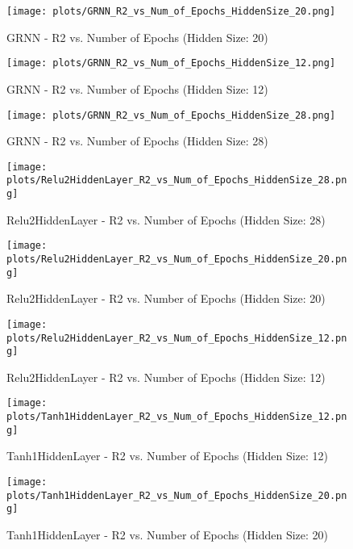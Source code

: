
\begin{figure}[H]
    \centering
    \texttt{[image: plots/GRNN\_R2\_vs\_Num\_of\_Epochs\_HiddenSize\_20.png]}
    \caption{GRNN - R2 vs. Number of Epochs (Hidden Size: 20)}
\end{figure}

\begin{figure}[H]
    \centering
    \texttt{[image: plots/GRNN\_R2\_vs\_Num\_of\_Epochs\_HiddenSize\_12.png]}
    \caption{GRNN - R2 vs. Number of Epochs (Hidden Size: 12)}
\end{figure}

\begin{figure}[H]
    \centering
    \texttt{[image: plots/GRNN\_R2\_vs\_Num\_of\_Epochs\_HiddenSize\_28.png]}
    \caption{GRNN - R2 vs. Number of Epochs (Hidden Size: 28)}
\end{figure}

\begin{figure}[H]
    \centering
    \texttt{[image: plots/Relu2HiddenLayer\_R2\_vs\_Num\_of\_Epochs\_HiddenSize\_28.png]}
    \caption{Relu2HiddenLayer - R2 vs. Number of Epochs (Hidden Size: 28)}
\end{figure}

\begin{figure}[H]
    \centering
    \texttt{[image: plots/Relu2HiddenLayer\_R2\_vs\_Num\_of\_Epochs\_HiddenSize\_20.png]}
    \caption{Relu2HiddenLayer - R2 vs. Number of Epochs (Hidden Size: 20)}
\end{figure}

\begin{figure}[H]
    \centering
    \texttt{[image: plots/Relu2HiddenLayer\_R2\_vs\_Num\_of\_Epochs\_HiddenSize\_12.png]}
    \caption{Relu2HiddenLayer - R2 vs. Number of Epochs (Hidden Size: 12)}
\end{figure}

\begin{figure}[H]
    \centering
    \texttt{[image: plots/Tanh1HiddenLayer\_R2\_vs\_Num\_of\_Epochs\_HiddenSize\_12.png]}
    \caption{Tanh1HiddenLayer - R2 vs. Number of Epochs (Hidden Size: 12)}
\end{figure}

\begin{figure}[H]
    \centering
    \texttt{[image: plots/Tanh1HiddenLayer\_R2\_vs\_Num\_of\_Epochs\_HiddenSize\_20.png]}
    \caption{Tanh1HiddenLayer - R2 vs. Number of Epochs (Hidden Size: 20)}
\end{figure}

